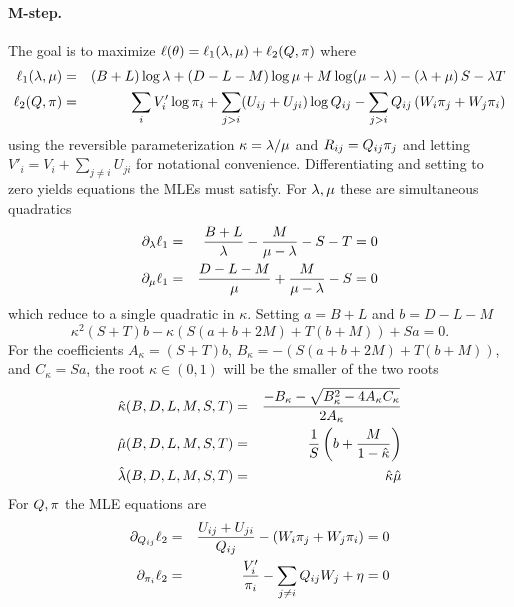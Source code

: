 \paragraph{M-step.}
The goal is to maximize $\ell(\theta) = \ell_1(\lambda,\mu) + \ell_2(Q,\pi)$ where
\begin{eqnarray}
\ell_1(\lambda,\mu) & = &
(B + L) \log\lambda + (D - L - M) \log\mu + M \log(\mu - \lambda)
    - (\lambda+\mu)\,S - \lambda T
\label{eq:ell1}
\\
\ell_2(Q,\pi) & = &
\sum_i V'_i \log \pi_i + \sum_{j>i} (U_{ij} + U_{ji}) \log Q_{ij} - \sum_{j > i} Q_{ij} \left( W_i \pi_j + W_j \pi_i \right)
\label{eq:ell2}
\end{eqnarray}
using the reversible parameterization $\kappa = \lambda/\mu$ and $R_{ij} = Q_{ij} \pi_j$
and letting $V'_i = V_i + \sum_{j \neq i} U_{ji}$ for notational convenience.
Differentiating and setting to zero yields equations the MLEs must satisfy.
For $\lambda,\mu$ these are simultaneous quadratics
\begin{eqnarray}
\partial_\lambda \ell_1 & = & \frac{B + L}{\lambda} - \frac{M}{\mu - \lambda} - S - T = 0 \\
\partial_\mu \ell_1 & = & \frac{D - L - M}{\mu} + \frac{M}{\mu - \lambda} - S = 0
\end{eqnarray}
which reduce to a single quadratic in $\kappa$. Setting $a = B + L$ and $b = D - L - M$
\begin{equation}\label{eq:kappa-quadratic}
\kappa^2 (S + T) b - \kappa \left( S(a + b + 2M) + T(b + M) \right) + S a = 0.
\end{equation}
For the coefficients $A_\kappa = (S + T) b$, $B_\kappa = -\left( S(a + b + 2M) + T(b + M) \right)$, and $C_\kappa = S a$,
the root $\kappa \in (0,1)$ will be the smaller of the two roots
\begin{eqnarray}
\hat{\kappa}(B,D,L,M,S,T) & = & \frac{-B_\kappa - \sqrt{B_\kappa^2 - 4 A_\kappa C_\kappa}}{2 A_\kappa} \label{eq:kappa-root} \\
\hat{\mu}(B,D,L,M,S,T) & = & \frac{1}{S}\left(b + \frac{M}{1-\hat{\kappa}}\right) \label{eq:delrate-root} \\
\hat{\lambda}(B,D,L,M,S,T) & = & \hat{\kappa} \hat{\mu} \label{eq:insrate-root}
\end{eqnarray}
For $Q,\pi$ the MLE equations are
\begin{eqnarray}
\partial_{Q_{ij}} \ell_2 & = & \frac{U_{ij} + U_{ji}}{Q_{ij}} - \left( W_i \pi_j + W_j \pi_i \right) = 0 \\
\partial_{\pi_i} \ell_2 & = & \frac{V'_i}{\pi_i} - \sum_{j \neq i} Q_{ij} W_j + \eta = 0
\end{eqnarray}
